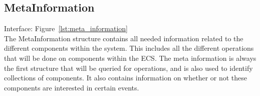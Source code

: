 \subsection{MetaInformation}
Interface: Figure~\ref{lst:meta_information}\\\noindent
The MetaInformation structure contains all needed information related to the different components within the system.
This includes all the different operations that will be done on components within the ECS.
The meta information is always the first structure that will be queried for operations, and is also used to identify collections of components.
It also contains information on whether or not these components are interested in certain events. 
